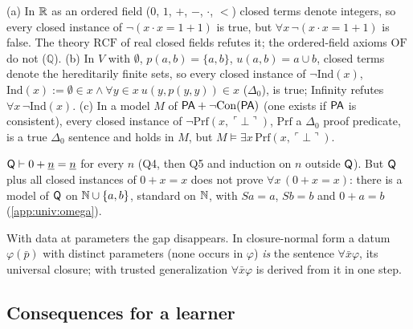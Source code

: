 \begin{example}\label{ex:univ:fail}
\textup{(a)} In $\mathbb{R}$ as an ordered field ($0$, $1$, $+$, $-$, $\cdot$, $<$) closed terms denote integers, so every closed instance of $\neg(x\cdot x=1+1)$ is true, but $\forall x\,\neg(x\cdot x=1+1)$ is false. The theory $\mathrm{RCF}$ of real closed fields refutes it; the ordered-field axioms $\mathrm{OF}$ do not ($\mathbb Q$).
\textup{(b)} In $V$ with $\emptyset$, $p(a,b)=\{a,b\}$, $u(a,b)=a\cup b$, closed terms denote the hereditarily finite sets, so every closed instance of $\neg\mathrm{Ind}(x)$, $\mathrm{Ind}(x):=\emptyset\in x\wedge\forall y{\in}x\ u(y,p(y,y))\in x$ ($\Delta_0$), is true; Infinity refutes $\forall x\,\neg\mathrm{Ind}(x)$.
\textup{(c)} In a model $M$ of $\mathsf{PA}+\neg\mathrm{Con}(\mathsf{PA})$ (one exists if $\mathsf{PA}$ is consistent), every closed instance of $\neg\mathrm{Prf}(x,\ulcorner\bot\urcorner)$, $\mathrm{Prf}$ a $\Delta_0$ proof predicate, is a true $\Delta_0$ sentence and holds in $M$, but $M\models\exists x\,\mathrm{Prf}(x,\ulcorner\bot\urcorner)$.
\end{example}

\begin{example}\label{ex:univ:q}
$\mathsf{Q}\vdash0+\underline{n}=\underline{n}$ for every $n$ (Q4, then Q5 and induction on $n$ outside $\mathsf{Q}$). But $\mathsf{Q}$ plus all closed instances of $0+x=x$ does not prove $\forall x\,(0+x=x)$: there is a model of $\mathsf{Q}$ on $\mathbb{N}\cup\{a,b\}$, standard on $\mathbb{N}$, with $Sa=a$, $Sb=b$ and $0+a=b$ (\cref{app:univ:omega}).
\end{example}

\begin{proposition}\label{prop:univ:gen}
With data at parameters the gap disappears. In closure-normal form a datum $\varphi(\bar p)$ with distinct parameters (none occurs in $\varphi$) \emph{is} the sentence $\forall\bar x\varphi$, its universal closure; with trusted generalization $\forall\bar x\varphi$ is derived from it in one step.
\end{proposition}

\subsection{Consequences for a learner}\label{sec:univ:learner}

